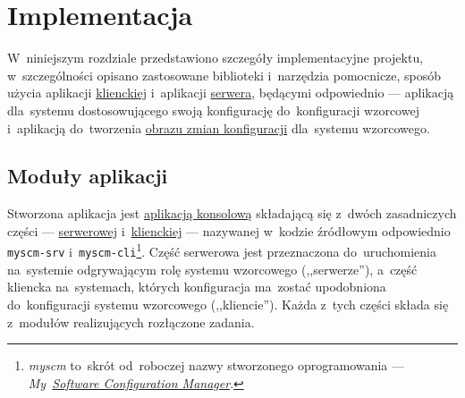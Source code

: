 \documentclass[thesis]{subfiles}
\begin{document}
\chapter{Implementacja}
\label{ch:implementacja}

W~niniejszym rozdziale przedstawiono szczegóły implementacyjne projektu, w~szczególności opisano zastosowane biblioteki i~narzędzia pomocnicze, sposób użycia aplikacji \hyperref[sec:cli-app]{klienckiej} i~aplikacji \hyperref[sec:srv-app]{serwera}, będącymi odpowiednio --- aplikacją dla~systemu dostosowującego swoją konfigurację do~konfiguracji wzorcowej i~aplikacją do~tworzenia \hyperref[sec:obraz-zmian-konfiguracji]{obrazu zmian konfiguracji} dla~systemu wzorcowego.


\section{Moduły aplikacji}

Stworzona aplikacja jest \href{https://en.wikipedia.org/wiki/Command-line_interface}{aplikacją konsolową} składającą się z~dwóch zasadniczych części --- \hyperref[sec:srv-app]{serwerowej} i~\hyperref[sec:cli-app]{klienckiej} --- nazywanej w~kodzie źródłowym odpowiednio \texttt{myscm-srv} i~\texttt{myscm-cli}\footnote{\emph{myscm} to~skrót od~roboczej nazwy stworzonego oprogramowania --- \emph{My~\href{https://en.wikipedia.org/wiki/Software_configuration_management}{Software Configuration Manager}}.}. Część serwerowa jest przeznaczona do~uruchomienia na~systemie odgrywającym rolę systemu wzorcowego (,,serwerze''), a~część kliencka na~systemach, których konfiguracja ma~zostać upodobniona do~konfiguracji systemu wzorcowego (,,kliencie''). Każda z~tych części składa się z~modułów realizujących rozłączone zadania.
\end{document}
